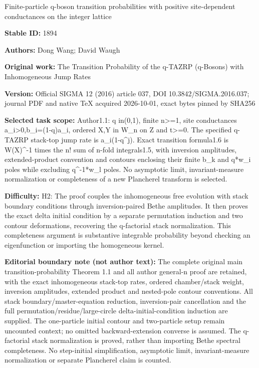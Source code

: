 \documentclass[11pt]{article}
\numberwithin{equation}{section}
\begin{document}
\begin{center}\Large Finite-particle q-boson transition probabilities with positive site-dependent conductances on the integer lattice\end{center}
\noindent\textbf{Stable ID:} 1894\par
\noindent\textbf{Authors:} Dong Wang; David Waugh\par
\noindent\textbf{Original work:} The Transition Probability of the q-TAZRP (q-Bosons) with Inhomogeneous Jump Rates\par
\noindent\textbf{Version:} Official SIGMA 12 (2016) article 037, DOI 10.3842/SIGMA.2016.037; journal PDF and native TeX acquired 2026-10-01, exact bytes pinned by SHA256\par
\noindent\textbf{Selected task scope:} Author1.1: q in(0,1), finite n>=\allowbreak{}1, site conductances a\_i>0,b\_i=\allowbreak{}(1-q)a\_i, ordered X,Y in W\_n on Z and t>=\allowbreak{}0. The specified q-TAZRP stack-top jump rate is a\_i(1-q\textasciicircum{}j). Exact transition formula1.6 is W(X)\textasciicircum{}-1 times the n! sum of n-fold integrals1.5, with inversion amplitudes, extended-product convention and contours enclosing their finite b\_k and q*\allowbreak{}w\_i poles while excluding q\textasciicircum{}-1*\allowbreak{}w\_l poles. No asymptotic limit, invariant-measure normalization or completeness of a new Plancherel transform is selected.\par
\noindent\textbf{Difficulty:} H2: The proof couples the inhomogeneous free evolution with stack boundary conditions through inversion-paired Bethe amplitudes. It then proves the exact delta initial condition by a separate permutation induction and two contour deformations, recovering the q-factorial stack normalization. This completeness argument is substantive integrable probability beyond checking an eigenfunction or importing the homogeneous kernel.\par
\noindent\textbf{Editorial boundary note (not author text):} The complete original main transition-probability Theorem 1.1 and all author general-n proof are retained, with the exact inhomogeneous stack-top rates, ordered chamber/stack weight, inversion amplitudes, extended product and nested-pole contour conventions. All stack boundary/master-equation reduction, inversion-pair cancellation and the full permutation/residue/large-circle delta-initial-condition induction are supplied. The one-particle initial contour and two-particle setup remain uncounted context; no omitted backward-extension converse is assumed. The q-factorial stack normalization is proved, rather than importing Bethe spectral completeness. No step-initial simplification, asymptotic limit, invariant-measure normalization or separate Plancherel claim is counted.\par
\end{document}
